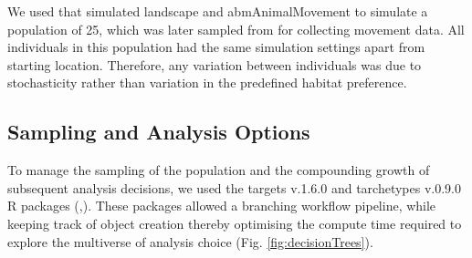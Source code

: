 \documentclass[10pt,a4paper]{article}
\begin{document}
We used that simulated landscape and abmAnimalMovement to simulate a population of 25, which was later sampled from for collecting movement data.
All individuals in this population had the same simulation settings apart from starting location.
Therefore, any variation between individuals was due to stochasticity rather than variation in the predefined habitat preference.

\subsection{Sampling and Analysis Options}\label{sampling-and-analysis-options}

To manage the sampling of the population and the compounding growth of subsequent analysis decisions, we used the targets v.1.6.0 and tarchetypes v.0.9.0 R packages (,).
These packages allowed a branching workflow pipeline, while keeping track of object creation thereby optimising the compute time required to explore the multiverse of analysis choice (Fig. \ref{fig:decisionTrees}).
\end{document}
